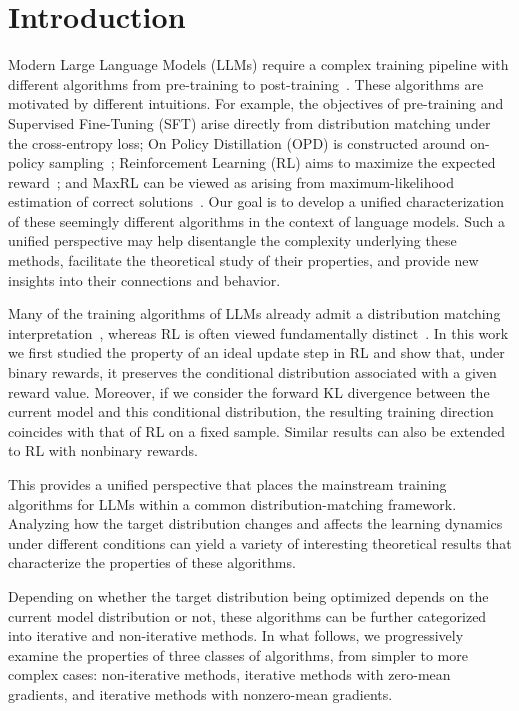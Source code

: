 \section{Introduction}

Modern Large Language Models (LLMs) require a complex training pipeline with different algorithms from pre-training to post-training~\citep{team_kimi_2026, deepseek-ai_deepseek-v4_2026, glm-5-team_glm-5_2026}. These algorithms are motivated by different intuitions. For example, the objectives of pre-training and Supervised Fine-Tuning (SFT) arise directly from distribution matching under the cross-entropy loss; On Policy Distillation (OPD) is constructed around on-policy sampling~\citep{lochab_uniform-correct_2026}; Reinforcement Learning (RL) aims to maximize the expected reward~\citep{williams_simple_1992}; and MaxRL can be viewed as arising from maximum-likelihood estimation of correct solutions~\citep{tajwar_maximum_2026}. Our goal is to develop a unified characterization of these seemingly different algorithms in the context of language models. Such a unified perspective may help disentangle the complexity underlying these methods, facilitate the theoretical study of their properties, and provide new insights into their connections and behavior.

Many of the training algorithms of LLMs already admit a distribution matching interpretation~\citep{korbak_reinforcement_2022, khalifa_distributional_2021}, whereas RL is often viewed fundamentally distinct~\citep{korbak_reinforcement_2022}. In this work we first studied the property of an ideal update step in RL and show that, under binary rewards, it preserves the conditional distribution associated with a given reward value. Moreover, if we consider the forward KL divergence between the current model and this conditional distribution, the resulting training direction coincides with that of RL on a fixed sample. Similar results can also be extended to RL with nonbinary rewards.

This provides a unified perspective that places the mainstream training algorithms for LLMs within a common distribution-matching framework. Analyzing how the target distribution changes and affects the learning dynamics under different conditions can yield a variety of interesting theoretical results that characterize the properties of these algorithms.

Depending on whether the target distribution being optimized depends on the current model distribution or not, these algorithms can be further categorized into iterative and non-iterative methods. In what follows, we progressively examine the properties of three classes of algorithms, from simpler to more complex cases: non-iterative methods, iterative methods with zero-mean gradients, and iterative methods with nonzero-mean gradients.


